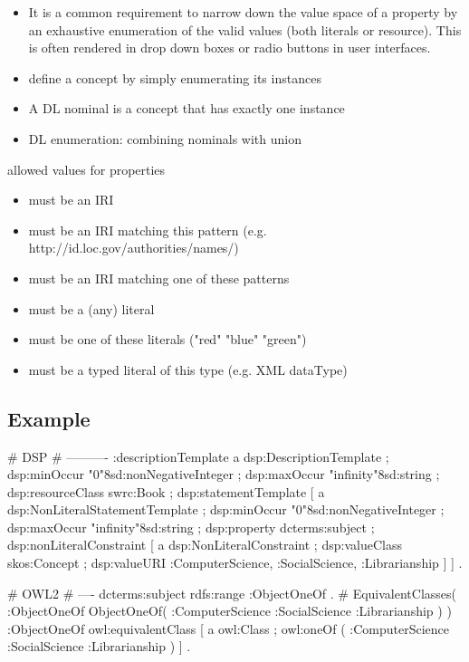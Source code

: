 \documentclass{llncs}
\begin{document}
\begin{itemize}
  \item It is a common requirement to narrow down the value space of a property by an exhaustive enumeration of the valid values (both literals or resource). This is often rendered in drop down boxes or radio buttons in user interfaces. 
	\item define a concept by simply enumerating its instances
	\item A DL nominal is a concept that has exactly one instance
	\item DL enumeration: combining nominals with union
\end{itemize}

allowed values for properties

\begin{itemize}
	\item must be an IRI
  \item must be an IRI matching this pattern (e.g. http://id.loc.gov/authorities/names/)
  \item must be an IRI matching one of these patterns
  \item must be a (any) literal
  \item must be one of these literals ("red" "blue" "green")
  \item must be a typed literal of this type (e.g. XML dataType)
\end{itemize}

\subsection{Example}

\begin{ex}
# DSP
# ----------
:descriptionTemplate 
    a dsp:DescriptionTemplate ;
    dsp:minOccur "0"^^xsd:nonNegativeInteger ; 
    dsp:maxOccur "infinity"^^xsd:string ; 
    dsp:resourceClass swrc:Book ; 
    dsp:statementTemplate [
        a dsp:NonLiteralStatementTemplate ;
        dsp:minOccur "0"^^xsd:nonNegativeInteger ; 
        dsp:maxOccur "infinity"^^xsd:string ; 
        dsp:property dcterms:subject ; 
        dsp:nonLiteralConstraint [ 
            a dsp:NonLiteralConstraint ;
            dsp:valueClass skos:Concept ;
            dsp:valueURI :ComputerScience, :SocialScience, :Librarianship ] ] .
\end{ex}

\begin{ex}
# OWL2
# ----
dcterms:subject rdfs:range :ObjectOneOf . 
# EquivalentClasses( :ObjectOneOf ObjectOneOf( :ComputerScience :SocialScience :Librarianship ) )
:ObjectOneOf owl:equivalentClass [ 
    a owl:Class ;
    owl:oneOf ( :ComputerScience :SocialScience :Librarianship ) ] .
\end{ex}
\end{document}
